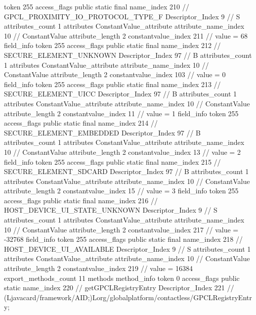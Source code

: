 {{{{{				token	255
				access_flags	public static final
				name_index	210		// GPCL_PROXIMITY_IO_PROTOCOL_TYPE_F
				Descriptor_Index	9		// S
				attributes_count	1
				attributes {
				ConstantValue_attribute {
					attribute_name_index	10		// ConstantValue
					attribute_length	2
					constantvalue_index	211		// value = 68
				}
				}
			}
			field_info {
				token	255
				access_flags	public static final
				name_index	212		// SECURE_ELEMENT_UNKNOWN
				Descriptor_Index	97		// B
				attributes_count	1
				attributes {
				ConstantValue_attribute {
					attribute_name_index	10		// ConstantValue
					attribute_length	2
					constantvalue_index	103		// value = 0
				}
				}
			}
			field_info {
				token	255
				access_flags	public static final
				name_index	213		// SECURE_ELEMENT_UICC
				Descriptor_Index	97		// B
				attributes_count	1
				attributes {
				ConstantValue_attribute {
					attribute_name_index	10		// ConstantValue
					attribute_length	2
					constantvalue_index	11		// value = 1
				}
				}
			}
			field_info {
				token	255
				access_flags	public static final
				name_index	214		// SECURE_ELEMENT_EMBEDDED
				Descriptor_Index	97		// B
				attributes_count	1
				attributes {
				ConstantValue_attribute {
					attribute_name_index	10		// ConstantValue
					attribute_length	2
					constantvalue_index	13		// value = 2
				}
				}
			}
			field_info {
				token	255
				access_flags	public static final
				name_index	215		// SECURE_ELEMENT_SDCARD
				Descriptor_Index	97		// B
				attributes_count	1
				attributes {
				ConstantValue_attribute {
					attribute_name_index	10		// ConstantValue
					attribute_length	2
					constantvalue_index	15		// value = 3
				}
				}
			}
			field_info {
				token	255
				access_flags	public static final
				name_index	216		// HOST_DEVICE_UI_STATE_UNKNOWN
				Descriptor_Index	9		// S
				attributes_count	1
				attributes {
				ConstantValue_attribute {
					attribute_name_index	10		// ConstantValue
					attribute_length	2
					constantvalue_index	217		// value = -32768
				}
				}
			}
			field_info {
				token	255
				access_flags	public static final
				name_index	218		// HOST_DEVICE_UI_AVAILABLE
				Descriptor_Index	9		// S
				attributes_count	1
				attributes {
				ConstantValue_attribute {
					attribute_name_index	10		// ConstantValue
					attribute_length	2
					constantvalue_index	219		// value = 16384
				}
				}
			}
			}
			export_methods_count	11
			methods {
				method_info {
					token	0
					access_flags	public static
					name_index	220		// getGPCLRegistryEntry
					Descriptor_Index	221		// (Ljavacard/framework/AID;)Lorg/globalplatform/contactless/GPCLRegistryEntry;
}}}}}
